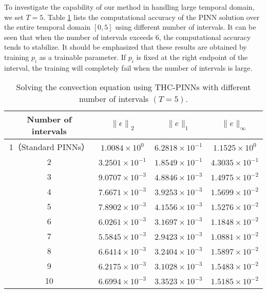\documentclass[preprint]{elsarticle}
\numberwithin{table}{section}
\numberwithin{equation}{section}
\numberwithin{figure}{section}
\begin{document}
\begin{CJK}{UTF8}{gbsn}
To investigate the capability of our method in handling large temporal domain, we set $T=5$. Table \ref{AE-multgroup} lists the computational accuracy of the PINN solution over the entire temporal domain  $[0,5]$ using different number of intervals. It can be seen that when the number of intervals exceeds $6$, the computational accuracy tends to stabilize.  {It should be emphasized that these results are obtained by training $p_i$
  as a trainable parameter. If $p_i$
  is fixed at the right endpoint of the interval, the training will completely fail when the number of intervals is large. }
\begin{table}[htbp]
    \centering
    \begin{tabular}{c|ccc}
        \hline
        Number of intervals &  $\left\|\epsilon\right\|_{2}$  & $\|e\|_1 $ & $\|e\|_\infty$ \\ 
        \hline
1（Standard PINNs） & $1.0084 \times 10^{0}$ & $6.2818 \times 10^{-1}$ & $1.1525 \times 10^{0}$ \\
2 & $3.2501 \times 10^{-1}$ & $1.8549 \times 10^{-1}$ & $4.3035 \times 10^{-1}$ \\
3 & $9.0707 \times 10^{-3}$ & $4.8846 \times 10^{-3}$ & $1.4975 \times 10^{-2}$ \\
4 & $7.6671 \times 10^{-3}$ & $3.9253 \times 10^{-3}$ & $1.5699
         \times 10^{-2}$ \\
5 & $7.8902 \times 10^{-3}$ & $4.1556 \times 10^{-3}$ & $1.5276 \times 10^{-2}$ \\
6 & $6.0261 \times 10^{-3}$ & $3.1697 \times 10^{-3}$ & $1.1848 \times 10^{-2}$ \\
7 & $5.5845 \times 10^{-3}$ & $2.9423\times 10^{-3}$ & $1.0881 \times 10^{-2}$ \\
8 & $6.6414 \times 10^{-3}$ & $3.2404 \times 10^{-3}$ & $1.5897 \times 10^{-2}$ \\
9 & $6.2175 \times 10^{-3}$ & $3.1028 \times 10^{-3}$ & $1.5483 \times 10^{-2}$ \\
10 & $6.6994 \times 10^{-3}$ & $3.3523 \times 10^{-3}$ & $1.5185 \times 10^{-2}$ \\
        \hline
    \end{tabular}
    \caption{Solving the convection equation using THC-PINNs with different number of intervals $(T=5)$.
    }
    \label{AE-multgroup}
\end{table}
 

\end{CJK}
\end{document}
